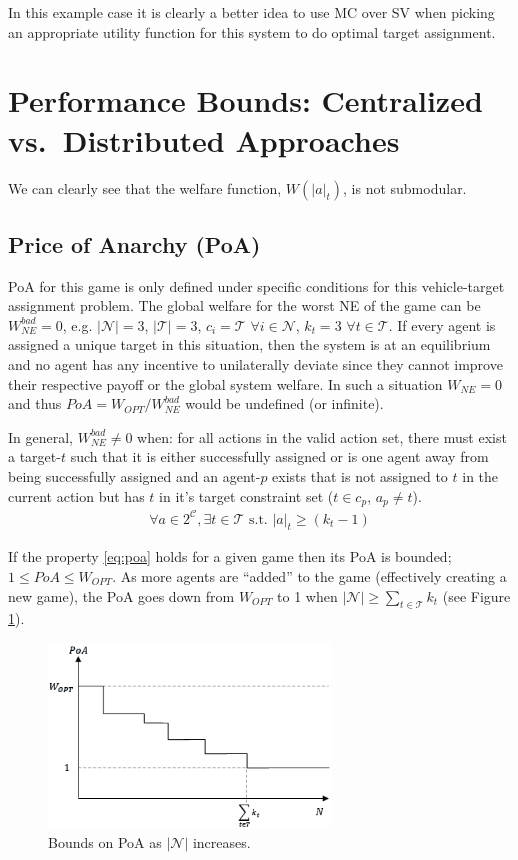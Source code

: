 \documentclass[11pt, onecolumn, compsoc, letterpaper]{article}
\newcommand{\Pl}{\mathcal{N}} %
\newcommand{\Ta}{\mathcal{T}} %
\newcommand{\Co}{\mathcal{C}} %
\begin{document}
In this example case it is clearly a better idea to use MC over SV when picking an appropriate utility function for this system to do optimal target assignment.

\section{Performance Bounds: Centralized vs.~Distributed Approaches}
We can clearly see that the welfare function, $W(|a|_t)$, is not submodular.
\subsection{Price of Anarchy (PoA)}
PoA for this game is only defined under specific conditions for this vehicle-target assignment problem. The global welfare for the worst NE of the game can be $W_{NE}^{bad} = 0$, e.g. $|\Pl| = 3$, $|\Ta| = 3$, $c_i = \Ta$ $\forall i \in \Pl$, $k_t = 3$ $\forall t \in \Ta$. If every agent is assigned a unique target in this situation, then the system is at an equilibrium and no agent has any incentive to unilaterally deviate since they cannot improve their respective payoff or the global system welfare. In such a situation $W_{NE} = 0$ and thus $PoA = W_{OPT} / W_{NE}^{bad}$ would be undefined (or infinite).

In general, $W_{NE}^{bad} \not= 0$ when: for all actions in the valid action set, there must exist a target-$t$ such that it is either successfully assigned or is one agent away from being successfully assigned and an agent-$p$ exists that is not assigned to $t$ in the current action but has $t$ in it's target constraint set ($t \in c_p$, $a_p \not= t$).
\begin{align}
	\forall a \in 2^\Co, \exists t \in \Ta \text{ s.t. } |a|_t \geq (k_t - 1)\label{eq:poa}
\end{align}

If the property \eqref{eq:poa} holds for a given game then its PoA is bounded; $1 \leq PoA \leq W_{OPT}$. As more agents are ``added'' to the game (effectively creating a new game), the PoA goes down from $W_{OPT}$ to 1 when $|\Pl| \geq \sum\limits_{t \in \Ta} k_t$ (see Figure \ref{fig:poa}).

\begin{figure}[!htb]
	\centering\includegraphics[width=7.5cm]{assets/poa.png}
	\centering\caption{Bounds on PoA as $|\Pl|$ increases.}\label{fig:poa}
\end{figure}
\end{document}
